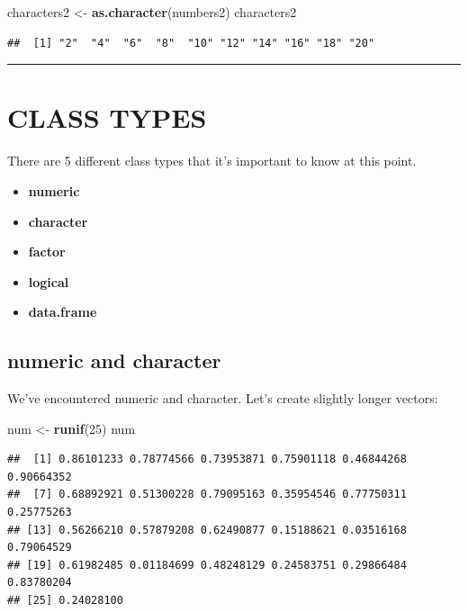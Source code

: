 \documentclass[
]{book}
\newenvironment{Shaded}{\begin{snugshade}}{\end{snugshade}}
\newcommand{\DecValTok}[1]{\textcolor[rgb]{0.00,0.00,0.81}{#1}}
\newcommand{\KeywordTok}[1]{\textcolor[rgb]{0.13,0.29,0.53}{\textbf{#1}}}
\newcommand{\NormalTok}[1]{#1}
\newcommand{\StringTok}[1]{\textcolor[rgb]{0.31,0.60,0.02}{#1}}
\providecommand{\tightlist}{%
  \setlength{\itemsep}{0pt}\setlength{\parskip}{0pt}}
\begin{document}
\begin{Shaded}
\begin{Highlighting}[]
\NormalTok{characters2 <-}\StringTok{ }\KeywordTok{as.character}\NormalTok{(numbers2)}
\NormalTok{characters2}
\end{Highlighting}
\end{Shaded}

\begin{verbatim}
##  [1] "2"  "4"  "6"  "8"  "10" "12" "14" "16" "18" "20"
\end{verbatim}

\begin{center}\rule{0.5\linewidth}{\linethickness}\end{center}

\hypertarget{class-types}{%
\section{CLASS TYPES}\label{class-types}}

There are 5 different class types that it's important to know at this point.

\begin{itemize}
\tightlist
\item
  \textbf{numeric}
\item
  \textbf{character}
\item
  \textbf{factor}
\item
  \textbf{logical}
\item
  \textbf{data.frame}
\end{itemize}

\hypertarget{numeric-and-character}{%
\subsection{numeric and character}\label{numeric-and-character}}

We've encountered numeric and character. Let's create slightly longer vectors:

\begin{Shaded}
\begin{Highlighting}[]
\NormalTok{num <-}\StringTok{ }\KeywordTok{runif}\NormalTok{(}\DecValTok{25}\NormalTok{)}
\NormalTok{num}
\end{Highlighting}
\end{Shaded}

\begin{verbatim}
##  [1] 0.86101233 0.78774566 0.73953871 0.75901118 0.46844268 0.90664352
##  [7] 0.68892921 0.51300228 0.79095163 0.35954546 0.77750311 0.25775263
## [13] 0.56266210 0.57879208 0.62490877 0.15188621 0.03516168 0.79064529
## [19] 0.61982485 0.01184699 0.48248129 0.24583751 0.29866484 0.83780204
## [25] 0.24028100
\end{verbatim}
\end{document}
